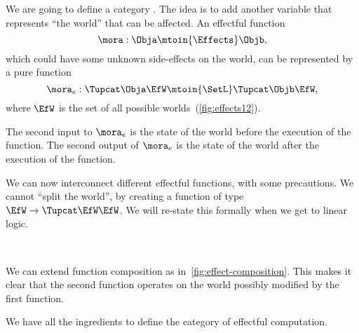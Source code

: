 We are going to define a category \Effects.
The idea is to add another variable that represents ``the world'' that can be affected.
An effectful function
%
\begin{equation}
    \mora: \Obja \mtoin{\Effects} \Objb,
\end{equation}
%
which could have some unknown side-effects on the world, can be represented by a pure function
%
\begin{equation}
    \mora_e:  \Tupcat \Obja   \EfW \mtoin{\SetL}   \Tupcat  \Objb \EfW,
\end{equation}
%
where $\EfW$ is the set of all possible worlds~(\cref{fig:effects12}).

The second input to $\mora_e$ is the state of the world before the execution of the function.
The second output of $\mora_e$ is the state of the world after the execution of the function.

We can now interconnect different effectful functions, with some precautions.
We cannot ``split the world'', by creating a function of type $\EfW \to \Tupcat \EfW \EfW$.
We will re-state this formally when we get to linear logic.

\begin{marginfigure}
    \centering
    \\
    \caption{}
    \label{fig:effect-composition}
\end{marginfigure}

We can extend function composition as in~\cref{fig:effect-composition}.
This makes it clear that the second function operates on the world possibly modified by the first function.

We have all the ingredients to define the category \Effects of effectful computation.

